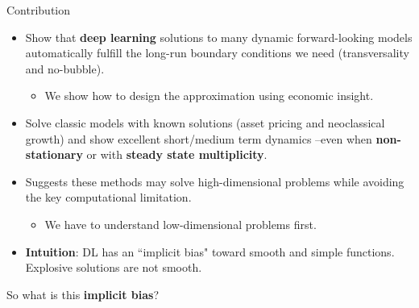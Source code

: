 \documentclass[aspectratio=169,10pt]{beamer}
\newcommand{\emphcolor}[1]{\textbf{\textcolor{emphcolorval}{#1}}}
\begin{document}
\begin{frame}{Contribution}
	
	\begin{itemize}
		\item Show that \emphcolor{deep learning} solutions to many dynamic forward-looking models automatically fulfill the long-run boundary conditions we need (transversality and no-bubble).\smallskip
		\begin{itemize}
			\item We show how to design the approximation using economic insight.
		\end{itemize}
		\medskip
		\item Solve classic models with known solutions (asset pricing and neoclassical growth) and show excellent short/medium term dynamics --even when \emphcolor{non-stationary} or with \emphcolor{steady state multiplicity}.
		\medskip
		\item Suggests these methods may solve high-dimensional problems while avoiding the key computational limitation. \smallskip
		\begin{itemize}
			\item We have to understand low-dimensional problems first. 
		\end{itemize}
		\item \emphcolor{Intuition}: DL has an ``implicit bias" toward smooth and simple functions. Explosive solutions are not smooth. 
	\end{itemize}
So what is this  \emphcolor{implicit bias}?
	
\end{frame}
				
	
\end{document}
